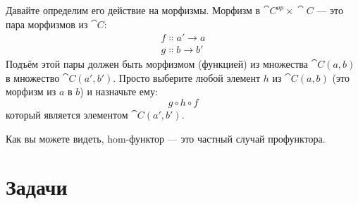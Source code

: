 Давайте определим его действие на морфизмы. Морфизм в
$\cat{C}^\mathit{op}\times{}\cat{C}$ --- это пара морфизмов из $\cat{C}$:
\begin{gather*}
  f \Colon a' \to a \\
  g \Colon b \to b'
\end{gather*}
Подъём этой пары должен быть морфизмом (функцией) из множества
$\cat{C}(a, b)$ в множество $\cat{C}(a', b')$. Просто выберите
любой элемент $h$ из $\cat{C}(a, b)$ (это морфизм из
$a$ в $b$) и назначьте ему:
\[g \circ h \circ f\]
который является элементом $\cat{C}(a', b')$.

Как вы можете видеть, hom-функтор --- это частный случай профунктора.

\section{Задачи}

